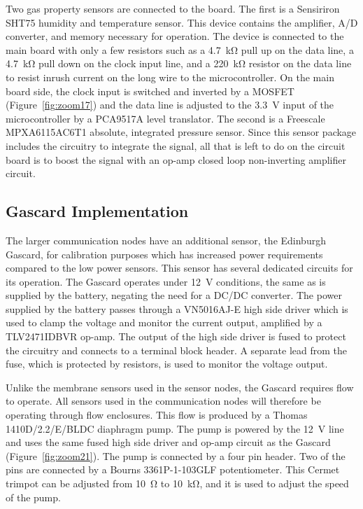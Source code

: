 \documentclass[numbook, envcountsect, envcountsame, envcountreset, runningheads, twocolumn]{svjour3}
\begin{document}
			Two gas property sensors are connected to the board.  The first is a Sensiriron SHT75 humidity and temperature sensor.  This device contains the amplifier, A/D converter, and memory necessary for operation.  The device is connected to the main board with only a few resistors such as a \SI{4.7}{\kilo\ohm} pull up on the data line, a \SI{4.7}{\kilo\ohm} pull down on the clock input line, and a \SI{220}{\kilo\ohm} resistor on the data line to resist inrush current on the long wire to the microcontroller.  On the main board side, the clock input is switched and inverted by a MOSFET (Figure~\ref{fig:zoom17}) and the data line is adjusted to the \SI{3.3}{\volt} input of the microcontroller by a PCA9517A level translator.  The second is a Freescale MPXA6115AC6T1 absolute, integrated pressure sensor.  Since this sensor package includes the circuitry to integrate the signal, all that is left to do on the circuit board is to boost the signal with an op-amp closed loop non-inverting amplifier circuit.  
			
		\subsection{Gascard Implementation}
			The larger communication nodes have an additional sensor, the Edinburgh Gascard, for calibration purposes which has increased power requirements compared to the low power sensors.  This sensor has several dedicated circuits for its operation.  The Gascard operates under \SI{12}{\volt} conditions, the same as is supplied by the battery, negating the need for a DC/DC converter.  The power supplied by the battery passes through a VN5016AJ-E high side driver which is used to clamp the voltage and monitor the current output, amplified by a TLV2471IDBVR op-amp.  The output of the high side driver is fused to protect the circuitry and connects to a terminal block header.  A separate lead from the fuse, which is protected by resistors, is used to monitor the voltage output.  
			
			Unlike the membrane sensors used in the sensor nodes, the Gascard requires flow to operate.  All sensors used in the communication nodes will therefore be operating through flow enclosures.  This flow is produced by a Thomas 1410D/2.2/E/BLDC diaphragm pump.  The pump is powered by the \SI{12}{\volt} line and uses the same fused high side driver and op-amp circuit as the Gascard (Figure~\ref{fig:zoom21}).  The pump is connected by a four pin header.  Two of the pins are connected by a Bourns 3361P-1-103GLF potentiometer.  This Cermet trimpot can be adjusted from \SI{10}{\ohm} to \SI{10}{\kilo\ohm}, and it is used to adjust the speed of the pump.  
			
\end{document}
